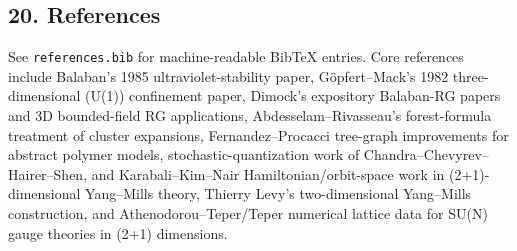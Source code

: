 \documentclass[
]{article}
\begin{document}
\subsection{20. References}\label{references}

See \texttt{references.bib} for machine-readable BibTeX entries. Core
references include Balaban's 1985 ultraviolet-stability paper,
Göpfert--Mack's 1982 three-dimensional (U(1)) confinement paper,
Dimock's expository Balaban-RG papers and 3D bounded-field RG
applications, Abdesselam--Rivasseau's forest-formula treatment of
cluster expansions, Fernandez--Procacci tree-graph improvements for
abstract polymer models, stochastic-quantization work of
Chandra--Chevyrev--Hairer--Shen, and Karabali--Kim--Nair
Hamiltonian/orbit-space work in (2+1)-dimensional Yang--Mills theory,
Thierry Levy's two-dimensional Yang--Mills construction, and
Athenodorou--Teper/Teper numerical lattice data for SU(N) gauge theories
in (2+1) dimensions.
\end{document}

